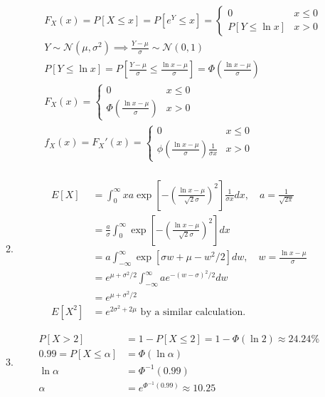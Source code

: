 \documentclass{article}
\begin{document}
\begin{enumerate}
\begin{enumerate}
\begin{align*}
&F_X(x) = P[X \leq x] =  P[e^Y \leq x] = \begin{cases}
0 & x \leq 0 \\
P[Y \leq \ln x] & x > 0
\end{cases} \\
&Y \sim \mathcal{N}(\mu, \sigma^2) \implies \frac{Y-\mu}{\sigma} \sim \mathcal{N}(0,1) \\
&P[Y \leq \ln x] = P\left[\frac{Y - \mu}{\sigma} \leq \frac{\ln x - \mu}{\sigma}\right] = \Phi\left(\frac{\ln x -\mu}{\sigma}\right) \\
&F_X(x) = \begin{cases}
0 & x \leq 0 \\
\Phi\left(\frac{\ln x -\mu}{\sigma}\right) & x > 0
\end{cases} \\
&f_X(x) = F_X'(x) = \begin{cases}
0 & x \leq 0 \\
\phi\left(\frac{\ln x -\mu}{\sigma}\right) \frac{1}{\sigma x} & x > 0
\end{cases} \\
\end{align*}

\item
\begin{align*}
E[X] &= \int_0^\infty x a \exp \left[ - \left(\frac{\ln x - \mu}{\sqrt{2}\sigma}\right)^2\right] \frac{1}{\sigma x} dx, \quad a =\frac{1}{\sqrt{2\pi}} \\
&= \frac{a}{\sigma}
\int_0^\infty \exp \left[ - \left(\frac{\ln x - \mu}{\sqrt{2}\sigma}\right)^2\right] dx \\
&= a \int_{-\infty}^\infty \exp \left[ \sigma w + \mu  - w^2 / 2\right] dw, \quad w = \frac{\ln x - \mu}{\sigma} \\
&= e^{\mu + \sigma^2 /2} \int_{-\infty}^\infty a e^{-(w - \sigma)^2 / 2} dw \\
&= \boxed{e^{\mu + \sigma^2 /2}} \\
E[X^2] &= \boxed{e^{2\sigma^2  + 2\mu}} \text{ by a similar calculation.}
\end{align*}

\item
\begin{align*}
P[X > 2]  &= 1 - P[X \leq 2] = 1 - \Phi(\ln 2) \approx \boxed{24.24\%} \\
0.99 = P[X \leq \alpha] &= \Phi(\ln \alpha) \\
\ln \alpha &= \Phi^{-1}(0.99) \\
\alpha &= e^{\Phi^{-1}(0.99)} \approx \boxed{10.25}
\end{align*}
\end{enumerate}


\end{enumerate}
\end{document}
